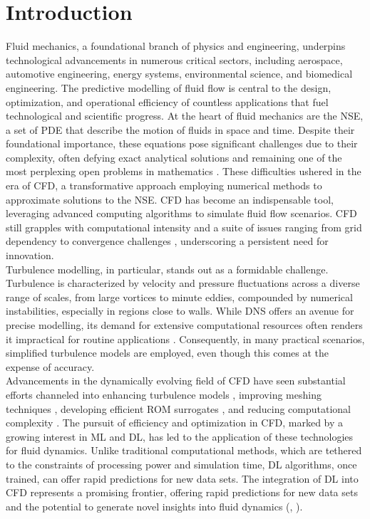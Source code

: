 \chapter{Introduction}
\label{chap:Intro}
Fluid mechanics, a foundational branch of physics and engineering, underpins technological advancements in numerous critical sectors, including aerospace, automotive engineering, energy systems, environmental science, and biomedical engineering. The predictive modelling of fluid flow is central to the design, optimization, and operational efficiency of countless applications that fuel technological and scientific progress. At the heart of fluid mechanics are the \gls{NSE}, a set of \gls{PDE} that describe the motion of fluids in space and time. Despite their foundational importance, these equations pose significant challenges due to their complexity, often defying exact analytical solutions and remaining one of the most perplexing open problems in mathematics \cite{fefferman2006existence}. These difficulties ushered in the era of \gls{CFD}, a transformative approach employing numerical methods to approximate solutions to the NSE. CFD has become an indispensable tool, leveraging advanced computing algorithms to simulate fluid flow scenarios. CFD still grapples with computational intensity and a suite of issues ranging from grid dependency to convergence challenges  \cite{ferziger2002computational}, underscoring a persistent need for innovation.\\
Turbulence modelling, in particular, stands out as a formidable challenge. Turbulence is characterized by velocity and pressure fluctuations across a diverse range of scales, from large vortices to minute eddies, compounded by numerical instabilities, especially in regions close to walls. While \gls{DNS} offers an avenue for precise modelling, its demand for extensive computational resources often renders it impractical for routine applications  \cite{moin1998direct}. Consequently, in many practical scenarios, simplified turbulence models are employed, even though this comes at the expense of accuracy.\\
Advancements in the dynamically evolving field of CFD have seen substantial efforts channeled into enhancing turbulence models \cite{pope2000turbulent}, improving meshing techniques \cite{thompson1998automatic}, developing efficient \gls{ROM} surrogates \cite{benner2015survey}, and reducing computational complexity \cite{schmid2010dynamic}. The pursuit of efficiency and optimization in CFD, marked by a growing interest in \gls{ML} and \gls{DL}, has led to the application of these technologies for fluid dynamics. Unlike traditional computational methods, which are tethered to the constraints of processing power and simulation time, DL algorithms, once trained, can offer rapid predictions for new data sets. The integration of DL into CFD represents a promising frontier, offering rapid predictions for new data sets and the potential to generate novel insights into fluid dynamics (\cite{kutz2017deep}, \cite{raissi2019physics}).\\
